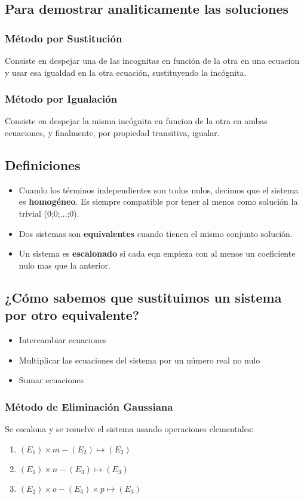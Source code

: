 \documentclass[10pt]{article}
\begin{document}
\subsection{Para demostrar analiticamente las soluciones}
\subsubsection{Método por Sustitución}
Consiste en despejar una de las incognitas en función de la otra en una ecuacion y usar esa igualdad en la otra ecuación, sustituyendo la incógnita.
\subsubsection{Método por Igualación}
Consiste en despejar la misma incógnita en funcion de la otra en ambas ecuaciones, y finalmente, por propiedad transitiva, igualar.
\subsection{Definiciones}
\begin{itemize}
\item Cuando los términos independientes son todos nulos, decimos que el sistema es \textbf{homogéneo}. Es siempre compatible por tener al menos como solución la trivial (0;0;...;0).
\item Dos sistemas son \textbf{equivalentes} cuando tienen el mismo conjunto solución.
\item Un sistema es \textbf{escalonado} si cada eqn empieza con al menos un coeficiente nulo mas que la anterior.
\end{itemize}
\subsection{¿Cómo sabemos que sustituimos un sistema por otro equivalente?}
\begin{itemize}
\item Intercambiar ecuaciones
\item Multiplicar las ecuaciones del sistema por un número real no nulo
\item Sumar ecuaciones
\end{itemize}
\subsubsection{Método de Eliminación Gaussiana}
Se escalona y se resuelve el sistema usando operaciones elementales:
\begin{enumerate}
\item $(E_1) \times m - (E_2) \mapsto (E_2)$
\item $(E_1) \times n - (E_3) \mapsto (E_3)$
\item $(E_2) \times o - (E_3) \times p \mapsto (E_3)$
\end{enumerate}
\end{document}
